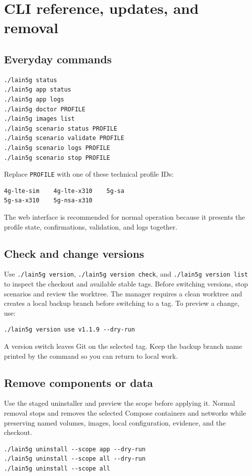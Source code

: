 \documentclass[11pt,a4paper,oneside]{article}
\newcommand{\cmd}[1]{\texttt{\small #1}}
\newcommand{\manualsection}[2]{\clearpage\section{#1}\label{#2}}
\begin{document}
\manualsection{CLI reference, updates, and removal}{cli}
\subsection{Everyday commands}
\begin{codebox}
\begin{Verbatim}[fontsize=\small]
./lain5g status
./lain5g app status
./lain5g app logs
./lain5g doctor PROFILE
./lain5g images list
./lain5g scenario status PROFILE
./lain5g scenario validate PROFILE
./lain5g scenario logs PROFILE
./lain5g scenario stop PROFILE
\end{Verbatim}
\end{codebox}

Replace \cmd{PROFILE} with one of these technical profile IDs:
\begin{codebox}
\begin{Verbatim}[fontsize=\small]
4g-lte-sim    4g-lte-x310    5g-sa
5g-sa-x310    5g-nsa-x310
\end{Verbatim}
\end{codebox}
The web interface is recommended for normal operation because it presents the profile state, confirmations, validation, and logs together.

\subsection{Check and change versions}
Use \cmd{./lain5g version}, \cmd{./lain5g version check}, and \cmd{./lain5g version list} to inspect the checkout and available stable tags. Before switching versions, stop scenarios and review the worktree. The manager requires a clean worktree and creates a local backup branch before switching to a tag. To preview a change, use:
\begin{codebox}
\begin{Verbatim}[fontsize=\small]
./lain5g version use v1.1.9 --dry-run
\end{Verbatim}
\end{codebox}

A version switch leaves Git on the selected tag. Keep the backup branch name printed by the command so you can return to local work.

\subsection{Remove components or data}
Use the staged uninstaller and preview the scope before applying it. Normal removal stops and removes the selected Compose containers and networks while preserving named volumes, images, local configuration, evidence, and the checkout.
\begin{codebox}
\begin{Verbatim}[fontsize=\small]
./lain5g uninstall --scope app --dry-run
./lain5g uninstall --scope all --dry-run
./lain5g uninstall --scope all
\end{Verbatim}
\end{codebox}
\end{document}

